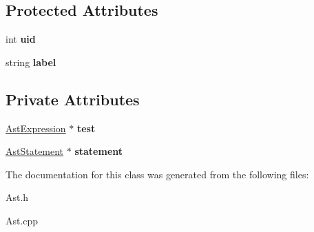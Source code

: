 \subsection*{Protected Attributes}
\begin{DoxyCompactItemize}
\item 
\hypertarget{classAST_a847b778f1c3dd5a19de32de432ee6e15}{int {\bfseries uid}}\label{classAST_a847b778f1c3dd5a19de32de432ee6e15}

\item 
\hypertarget{classAST_ab2e239ccc0688d2341724432ff5a1a31}{string {\bfseries label}}\label{classAST_ab2e239ccc0688d2341724432ff5a1a31}

\end{DoxyCompactItemize}
\subsection*{Private Attributes}
\begin{DoxyCompactItemize}
\item 
\hypertarget{classAstDoWhile_a178e28e21ffefcd0dd2106f13b35220a}{\hyperlink{classAstExpression}{Ast\-Expression} $\ast$ {\bfseries test}}\label{classAstDoWhile_a178e28e21ffefcd0dd2106f13b35220a}

\item 
\hypertarget{classAstDoWhile_afc6f50c748278c661be0e03d47f90db1}{\hyperlink{classAstStatement}{Ast\-Statement} $\ast$ {\bfseries statement}}\label{classAstDoWhile_afc6f50c748278c661be0e03d47f90db1}

\end{DoxyCompactItemize}


The documentation for this class was generated from the following files\-:\begin{DoxyCompactItemize}
\item 
Ast.\-h\item 
Ast.\-cpp\end{DoxyCompactItemize}
